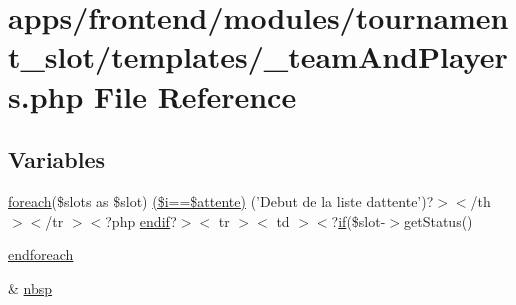 \hypertarget{frontend_2modules_2tournament__slot_2templates_2__team_and_players_8php}{\section{apps/frontend/modules/tournament\-\_\-slot/templates/\-\_\-team\-And\-Players.php File Reference}
\label{frontend_2modules_2tournament__slot_2templates_2__team_and_players_8php}
}
\subsection*{Variables}
\begin{DoxyCompactItemize}
\item 
\hyperlink{presse_2modules_2news_2templates_2index_success_8php_abc56db52b2e9a59bcd5c9e45ac5cb332}{foreach}(\$slots as \$slot) \hyperlink{frontend_2modules_2tournament__slot_2templates_2__team_and_players_8php_a88fcfd2a89532c201ea2ea52fd51dbc4}{(\$i==\$attente)} ('Debut de la liste dattente')?$>$$<$/th $>$$<$/tr $>$$<$?php \hyperlink{live_2templates_2layout_8php_a82cd33ca97ff99f2fcc5e9c81d65251b}{endif}?$>$$<$ tr $>$$<$ td $>$$<$?\hyperlink{live_2modules_2tournament_2templates_2__form_team_8php_ae30a307b320d8da5d9a945eaf68f7549}{if}(\$slot-\/$>$get\-Status()
\item 
\hyperlink{frontend_2modules_2tournament__slot_2templates_2__team_and_players_8php_a672d9707ef91db026c210f98cc601123}{endforeach}
\item 
\& \hyperlink{frontend_2modules_2tournament__slot_2templates_2__team_and_players_8php_aef915316f784c9063d942974538301a6}{nbsp}
\end{DoxyCompactItemize}


